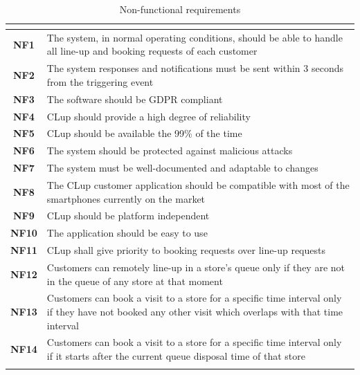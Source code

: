 \documentclass[a4paper,oneside,11pt]{book}
\begin{document}
    \newpage
    \begin{longtable}[c]{|>{\bfseries{}}c|H{.65\textwidth}|}
        \hline
         \\ \hline
        \hypertarget{NF1}{NF1} & The system, in normal operating conditions, should be able to handle all line-up and booking requests of each customer \\ \hline
        NF2 & The system responses and notifications must be sent within 3 seconds from the triggering event \\ \hline
        NF3 & The software should be GDPR compliant \\ \hline
        NF4 & CLup should provide a high degree of reliability \\ \hline
        \hypertarget{NF5}{NF5} & CLup should be available the 99\% of the time \\ \hline
        \hypertarget{NF6}{NF6} & The system should be protected against malicious attacks \\ \hline
        NF7 & The system must be well-documented and adaptable to changes \\ \hline
        NF8 & The CLup customer application should be compatible with most of the smartphones currently on the market \\ \hline
        NF9 & CLup should be platform independent \\ \hline
        NF10 & The application should be easy to use \\ \hline
        NF11 & CLup shall give priority to booking requests over line-up requests \\ \hline
        NF12 & Customers can remotely line-up in a store’s queue only if they are not in the queue of any store at that moment \\ \hline
        NF13 & Customers can book a visit to a store for a specific time interval only if they have not booked any other visit which overlaps with that time interval \\ \hline
        NF14 & Customers can book a visit to a store for a specific time interval only if it starts after the current queue disposal time of that store \\ \hline
        \caption{Non-functional requirements}
        \label{table:non_functional_requirements}
    \end{longtable}
\end{document}
